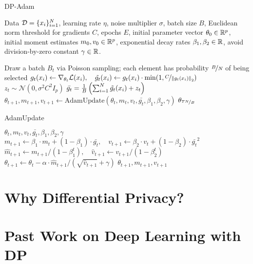 \vspace{-2mm}
\begin{algorithm}[H]\label{algo:dp_adam}
\centering
\caption{DP-Adam}
\begin{algorithmic}[1]
  Data $\mathcal{D}=\{x_i\}_{i=1}^N$, learning rate $\eta$, noise multiplier $\sigma$, batch size $B$, Euclidean norm threshold for gradients $C$, epochs $E$, initial parameter vector $\theta_0\in\mathbb{R}^p$, initial moment estimates $m_0, v_0 \in \mathbb{R}^p$,
  exponential decay rates $\beta_1, \beta_2 \in \mathbb{R}$,
  avoid division-by-zero constant $\gamma\in \mathbb{R}$.


    \State Draw a batch $B_t$ via Poisson sampling; each element has probability $\nicefrac{B}{N}$ of being selected
        \State
        $
        g_t(x_i) \gets \nabla_{\theta_t} \mathcal{L}(x_i), \quad
        \tilde{g_t}(x_i) \gets g_t(x_i) \cdot \min(1, \nicefrac{C}{ \left\lVert g_t(x_i)\right\rVert_2 })
        $
    \EndFor
    \State $z_t \sim \mathcal{N}(0, \sigma^2 C^2 I_p)$
    \State $\bar{g_t} = \frac{1}{B} \left( 
        \sum_{i=1}^N \tilde{g_t}(x_i) + z_t
    \right)$
    \State $\theta_{t + 1}, m_{t+1}, v_{t+1} \gets \text{AdamUpdate}(\theta_t, m_{t}, v_{t}, \bar{g_t}, \beta_1, \beta_2, \gamma)$
    \EndFor
\State \Return $\theta_{\nicefrac{TN}{B}}$
\end{algorithmic}
\end{algorithm}

\vspace{-6mm}
\begin{algorithm}[H]\label{algo:adam_update}
\centering
\caption{AdamUpdate}
\begin{algorithmic}[1]
  $\theta_t, m_t, v_t, \bar{g_t}, \beta_1, \beta_2, \gamma$ 
  \State
  $
  m_{t+1} \leftarrow
    \beta_{1} \cdot m_{t} + \left(1-\beta_{1}\right) \cdot \bar{g_t}, \quad 
  v_{t+1} \leftarrow
    \beta_{2} \cdot v_{t}+\left(1-\beta_{2}\right) \cdot \bar{g_t}^{2}
  $
  \State
  $
  \widehat{m}_{t+1} \leftarrow m_{t+1} /\left(1-\beta_{1}^{t}\right), \quad
  \widehat{v}_{t+1} \leftarrow v_{t+1} /\left(1-\beta_{2}^{t}\right)
  $
  \State
  $
  \theta_{t+1} \leftarrow \theta_{t}-\alpha \cdot \widehat{m}_{t+1} /\left(\sqrt{\widehat{v}_{t+1}}+\gamma\right)
  $
  \State  \Return $\theta_{t+1}, m_{t +1}, v_{t + 1}$
\end{algorithmic}
\end{algorithm}



\section{Why Differential Privacy?}

\section{Past Work on Deep Learning with DP}
